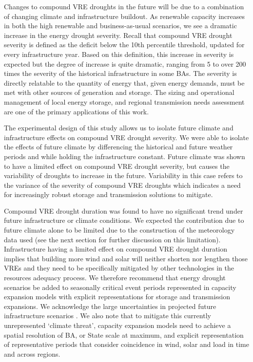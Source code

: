 \documentclass{agujournal2019}
\begin{document}
Changes to compound VRE droughts in the future will be due to a combination of changing climate and infrastructure buildout. As renewable capacity increases in both the high renewable and business-as-usual scenarios, we see a dramatic increase in the energy drought severity. Recall that compound VRE drought severity is defined as the deficit below the 10th percentile threshold, updated for every infrastructure year. Based on this definition, this increase in severity is expected but the degree of increase is quite dramatic, ranging from 5 to over 200 times the severity of the historical infrastructure in some BAs. The severity is directly relatable to the quantity of energy that, given energy demands, must be met with other sources of generation and storage. The sizing and operational management of local energy storage, and regional transmission needs assessment are one of the primary applications of this work.  

The experimental design of this study allows us to isolate future climate and infrastructure effects on compound VRE drought severity. We were able to isolate the effects of future climate by differencing the historical and future weather periods and while holding the infrastructure constant. Future climate was shown to have a limited effect on compound VRE drought severity, but causes the variability of droughts to increase in the future. Variability in this case refers to the variance of the severity of compound VRE droughts which indicates a need for increasingly robust storage and transmission solutions to mitigate. 

Compound VRE drought duration was found to have no significant trend under future infrastructure or climate conditions. We expected the contribution due to future climate alone to be limited due to the construction of the meteorology data used (see the next section for further discussion on this limitation). Infrastructure having a limited effect on compound VRE drought duration implies that building more wind and solar will neither shorten nor lengthen those VREs and they need to be specifically mitigated by other technologies in the resources adequacy process. We therefore recommend that energy drought scenarios be added to seasonally critical event periods represented in capacity expansion models with explicit representations for storage and transmission expansions. We acknowledge the large uncertainties in projected future infrastructure scenarios \cite{Browning_2023}. We also note that to mitigate this currently unrepresented `climate threat', capacity expansion models need to achieve a spatial resolution of BA, or State scale at maximum, and explicit representation of representative periods that consider coincidence in wind, solar and load in time and across regions. 
\end{document}
